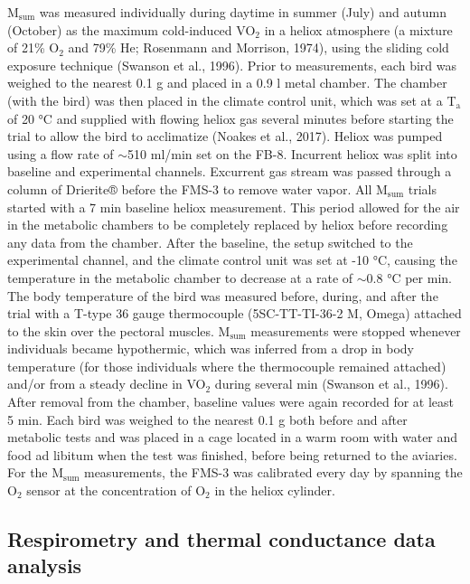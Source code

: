 \documentclass[10pt, twoside]{book} %
\begin{document}
M$_{\text{sum}}$ was measured individually during daytime in summer (July) and autumn (October) as the maximum cold-induced VO$_{\text{2}}$ in a heliox atmosphere (a mixture of 21\% O$_{\text{2}}$ and 79\% He; Rosenmann and Morrison, 1974), using the sliding cold exposure technique (Swanson et al., 1996). Prior to measurements, each bird was weighed to the nearest 0.1 g and placed in a 0.9 l metal chamber. The chamber (with the bird) was then placed in the climate control unit, which was set at a T$_{\text{a}}$ of 20 °C and supplied with flowing heliox gas several minutes before starting the trial to allow the bird to acclimatize (Noakes et al., 2017). Heliox was pumped using a flow rate of $\sim$510 ml/min set on the FB-8. Incurrent heliox was split into baseline and experimental channels. Excurrent gas stream was passed through a column of Drierite® before the FMS-3 to remove water vapor. All M$_{\text{sum}}$ trials started with a 7 min baseline heliox measurement. This period allowed for the air in the metabolic chambers to be completely replaced by heliox before recording any data from the chamber. After the baseline, the setup switched to the experimental channel, and the climate control unit was set at -10 °C, causing the temperature in the metabolic chamber to decrease at a rate of $\sim$0.8 °C per min. The body temperature of the bird was measured before, during, and after the trial with a T-type 36 gauge thermocouple (5SC-TT-TI-36-2 M, Omega) attached to the skin over the pectoral muscles. M$_{\text{sum}}$ measurements were stopped whenever individuals became hypothermic, which was inferred from a drop in body temperature (for those individuals where the thermocouple remained attached) and/or from a steady decline in VO$_{\text{2}}$ during several min (Swanson et al., 1996). After removal from the chamber, baseline values were again recorded for at least 5 min. Each bird was weighed to the nearest 0.1 g both before and after metabolic tests and was placed in a cage located in a warm room with water and food ad libitum when the test was finished, before being returned to the aviaries. For the M$_{\text{sum}}$ measurements, the FMS-3 was calibrated every day by spanning the O$_{\text{2}}$ sensor at the concentration of O$_{\text{2}}$ in the heliox cylinder.\\

\subsection{Respirometry and thermal conductance data analysis}
\end{document}

